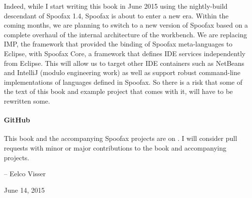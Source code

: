 Indeed, while I start writing this book in June 2015 using the nightly-build
descendant of Spoofax 1.4, Spoofax is about to enter a new era.
Within the coming months, we are planning to switch to a new version of Spoofax
based on a complete overhaul of the internal architecture of the workbench.
We are replacing IMP, the framework that provided the binding of Spoofax
meta-languages to Eclipse, with Spoofax Core, a framework that defines IDE
services independently from Eclipse. This will allow us to target other IDE
containers such as NetBeans and IntelliJ (modulo engineering work) as well as
support robust command-line implementations of languages defined in Spoofax. So
there is a risk that some of the text of this book and example project that
comes with it, will have to be rewritten some.

\paragraph{GitHub}

This book and the accompanying Spoofax projects are on . 
I will consider pull requests with minor or major contributions to the book
and accompanying projects.

-- Eelco Visser

June 14, 2015


